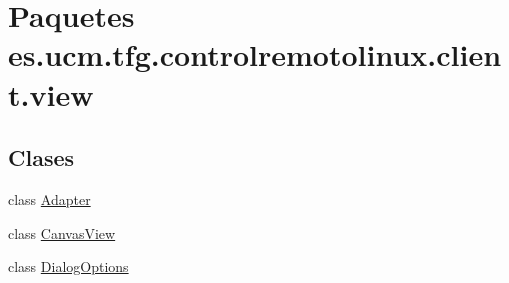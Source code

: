 \hypertarget{namespacees_1_1ucm_1_1tfg_1_1controlremotolinux_1_1client_1_1view}{\section{Paquetes es.\-ucm.\-tfg.\-controlremotolinux.\-client.\-view}
\label{namespacees_1_1ucm_1_1tfg_1_1controlremotolinux_1_1client_1_1view}
}
\subsection*{Clases}
\begin{DoxyCompactItemize}
\item 
class \hyperlink{classes_1_1ucm_1_1tfg_1_1controlremotolinux_1_1client_1_1view_1_1Adapter}{Adapter}
\item 
class \hyperlink{classes_1_1ucm_1_1tfg_1_1controlremotolinux_1_1client_1_1view_1_1CanvasView}{Canvas\-View}
\item 
class \hyperlink{classes_1_1ucm_1_1tfg_1_1controlremotolinux_1_1client_1_1view_1_1DialogOptions}{Dialog\-Options}
\end{DoxyCompactItemize}
